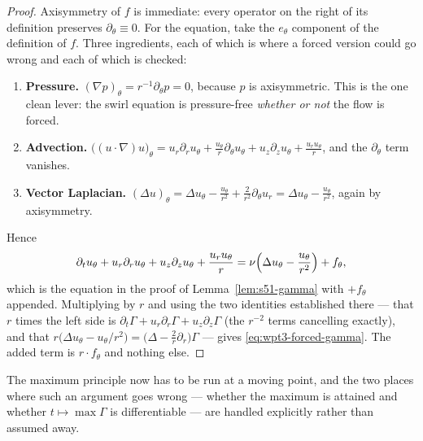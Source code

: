 \documentclass[11pt]{article}
\theoremstyle{definition}
\theoremstyle{remark}
\newcommand{\grad}{\nabla}
\begin{document}
\begin{proof}
  Axisymmetry of $f$ is immediate: every operator on the right of its
  definition preserves $\partial_\theta\equiv0$. For the equation, take the
  $e_\theta$ component of the definition of $f$. Three ingredients, each of
  which is where a forced version could go wrong and each of which is checked:
  \begin{enumerate}[label=(\alph*),leftmargin=2.2em]
    \item \textbf{Pressure.} $(\grad p)_\theta=r^{-1}\partial_\theta p=0$,
      because $p$ is axisymmetric. This is the one clean lever: the swirl
      equation is pressure-free \emph{whether or not} the flow is forced.
    \item \textbf{Advection.}
      $\bigl((u\cdot\grad)u\bigr)_\theta
       =u_r\partial_ru_\theta+\frac{u_\theta}{r}\partial_\theta u_\theta
        +u_z\partial_zu_\theta+\frac{u_ru_\theta}{r}$, and the
      $\partial_\theta$ term vanishes.
    \item \textbf{Vector Laplacian.}
      $(\Delta u)_\theta=\Delta u_\theta-\frac{u_\theta}{r^2}
       +\frac{2}{r^2}\partial_\theta u_r
       =\Delta u_\theta-\frac{u_\theta}{r^2}$, again by axisymmetry.
  \end{enumerate}
  Hence
  \[
    \partial_tu_\theta+u_r\partial_ru_\theta+u_z\partial_zu_\theta
      +\frac{u_ru_\theta}{r}
    =\nu\Bigl(\Delta u_\theta-\frac{u_\theta}{r^2}\Bigr)+f_\theta ,
  \]
  which is the equation in the proof of Lemma~\ref{lem:s51-gamma} with
  $+f_\theta$ appended. Multiplying by $r$ and using the two identities
  established there --- that $r$ times the left side is
  $\partial_t\Gamma+u_r\partial_r\Gamma+u_z\partial_z\Gamma$ (the $r^{-2}$
  terms cancelling exactly), and that
  $r\bigl(\Delta u_\theta-u_\theta/r^2\bigr)
    =\bigl(\Delta-\tfrac2r\partial_r\bigr)\Gamma$ --- gives
  \eqref{eq:wpt3-forced-gamma}. The added term is $r\cdot f_\theta$ and
  nothing else.
\end{proof}

The maximum principle now has to be run at a moving point, and the two places
where such an argument goes wrong --- whether the maximum is attained and
whether $t\mapsto\max\Gamma$ is differentiable --- are handled explicitly
rather than assumed away.
\end{document}
